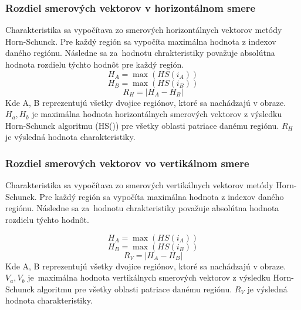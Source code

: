 \subsubsection{Rozdiel smerových vektorov v horizontálnom smere}
Charakteristika sa vypočítava zo smerových horizontálnych vektorov metódy Horn-Schunck.
Pre každý región sa vypočíta maximálna hodnota z indexov daného regiónu.
Následne sa za~hodnotu chrakteristiky považuje absolútna hodnota rozdielu týchto hodnôt pre každý región.
\begin{equation}
  H_A = \max(HS(i_A))
\end{equation}
\begin{equation}
  H_B = \max(HS(i_B))
\end{equation}
\begin{equation}
  R_{H} = \left|H_A-H_B\right|
\end{equation}
Kde A, B reprezentujú všetky dvojice regiónov, ktoré sa nachádzajú v obraze.
\begin{math}H_a, H_b\end{math} je maximálna hodnota horizontálnych smerových vektorov z výsledku Horn-Schunck algoritmu (HS()) pre všetky oblasti patriace danému regiónu.
\begin{math}R_{H}\end{math} je výsledná hodnota charakteristiky.

\subsubsection{Rozdiel smerových vektorov vo vertikálnom smere}
Charakteristika sa vypočítava zo smerových vertikálnych vektorov metódy Horn-Schunck.
Pre každý región sa vypočíta maximálna hodnota z indexov daného regiónu.
Následne sa za~hodnotu chrakteristiky považuje absolútna hodnota rozdielu týchto hodnôt.

\begin{equation}
  H_A = \max(HS(i_A))
\end{equation}
\begin{equation}
  H_B = \max(HS(i_B))
\end{equation}
\begin{equation}
  R_{V} = \left|H_A-H_B\right|
\end{equation}
Kde A, B reprezentujú všetky dvojice regiónov, ktoré sa nachádzajú v obraze.
\begin{math}V_a, V_b\end{math} je~maximálna hodnota vertikálnych smerových vektorov z výsledku Horn-Schunck algoritmu pre všetky oblasti patriace danému regiónu.
\begin{math}R_{V}\end{math} je výsledná hodnota charakteristiky.

